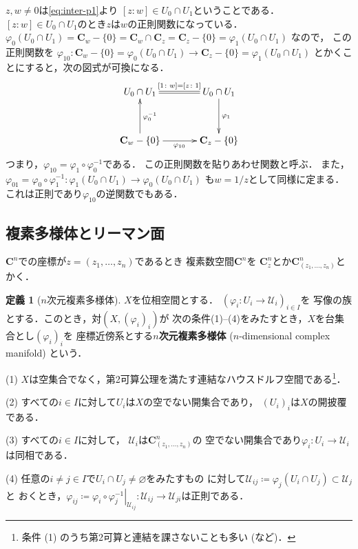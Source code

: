 \documentclass[11pt, a4paper, dvipdfmx, draft]{jsarticle}
\theoremstyle{definition}
\newtheorem{Definition}[Axiom]{定義}
\newcommand{\cc}{\mathbf{C}}
\newcommand{\mcal}{\mathcal}
\newcommand{\pphi}{\varphi} %
\newcommand{\UU}{\mcal{U}}
\newcommand{\emp}{\varnothing}
\newcommand{\ceq}{\coloneqq}
\newcommand{\sbs}{\subset}
\newcommand{\mapres}[2]{\left. #1 \right|_{#2}}
\theoremstyle{mystyle}
\numberwithin{equation}{section} %
\begin{document}
$z,w\ne 0$は\eqref{eq:inter-p1}より
$[z\colon w]\in U_0\cap U_1$ということである．
$[z\colon w]\in U_0\cap U_1$のとき$z$は$w$の正則関数になっている．
$\pphi_0 (U_0\cap U_1) = \cc_w-\{0\} 
= \cc_w \cap \cc_z 
= \cc_z-\{0\} 
= \pphi_1 (U_0\cap U_1)$
なので，
この正則関数を
$\pphi_{10}\colon \cc_w-\{0\}=\pphi_0 (U_0\cap U_1) 
\to \cc_z-\{0\} = \pphi_1 (U_0\cap U_1)$
とかくことにすると，次の図式が可換になる．
\begin{equation*}
    \vcenter{\xymatrix@C=35pt@R=35pt{
    {U_0\cap U_1} 
        \ar@{<-{}}[d]^{\pphi_0^{-1}} 
        \ar@{{}=}[r]^-{[1\colon w]=[z\colon 1]}
    & {U_0 \cap U_1} 
        \\
    \cc_w -\{0\}
        \ar[r]_{\pphi_{10}}
    & \cc_z -\{0\}
        \ar@{<-{}}[u]_{\pphi_1}
    }}
\end{equation*}
つまり，$\pphi_{10} = \pphi_1\circ \pphi_0^{-1}$である．
この正則関数を貼りあわせ関数と呼ぶ．
また，$\pphi_{01} = \pphi_0\circ \pphi_1^{-1}\colon \pphi_1 (U_0\cap U_1) \to \pphi_0 (U_0\cap U_1)$
も$w=1/z$として同様に定まる．これは正則であり$\pphi_{10}$の逆関数でもある．

\subsection{複素多様体とリーマン面}

$\cc^{n}$での座標が$z=(z_{1},\dots,z_{n})$であるとき
複素数空間$\cc^{n}$を
$\cc^{n}_{z}$とか$\cc^{n}_{(z_{1},\dots,z_{n})}$とかく．

\begin{Definition}[$n$次元複素多様体]
    $X$を位相空間とする．
    $(\pphi_{i}\colon U_{i}\to \UU_{i})_{i\in I}$を
    写像の族とする．このとき，対$(X,(\pphi_{i})_{i})$が
    次の条件(1)--(4)をみたすとき，$X$を台集合とし$(\pphi_{i})_i$を
    座標近傍系とする\textbf{$n$次元複素多様体} ($n$-dimensional complex manifold) という．

    (1) 
    $X$は空集合でなく，第2可算公理を満たす連結なハウスドルフ空間である\footnote{
        条件 (1) のうち第2可算と連結を課さないことも多い (\cite{kobayashi1}など)．}．

    (2) 
    すべての$i\in I$に対して$U_i$は$X$の空でない開集合であり，
    $(U_i)_i$は$X$の開披覆である．

    (3) 
    すべての$i\in I$に対して，
    $\UU_i$は$\cc^{n}_{(z_{1},\dots,z_{n})}$の
    空でない開集合であり$\pphi_{i}\colon U_i\to\UU_i$は同相である．

    (4) 
    任意の$i\neq j \in I$で$U_i\cap U_j \neq \emp$をみたすもの
    に対して$\UU_{ij}\ceq \pphi_j(U_i\cap U_j)\sbs \UU_j$と
    おくとき，$\pphi_{ij}\ceq 
    \mapres{\pphi_{i}\circ\pphi_{j}^{-1}}{\UU_{ij}}
    \colon 
    \UU_{ij}\to\UU_{ji}$は正則である．
\end{Definition}
\end{document}
